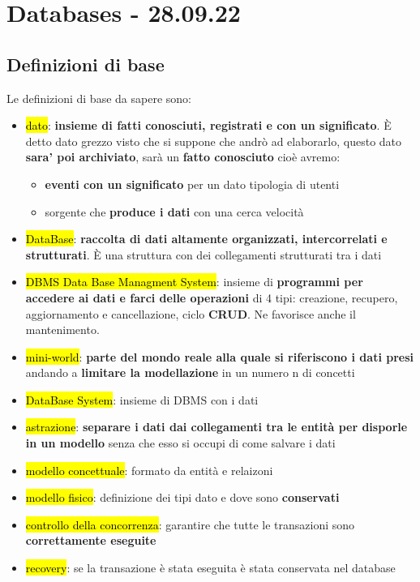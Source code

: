 \newpage
\section{Databases - 28.09.22}

\subsection{Definizioni di base}

Le definizioni di base da sapere sono:
\begin{itemize}
	\item \hl{dato}: \textbf{insieme di fatti conosciuti, registrati e con un significato}. È detto dato grezzo visto che si suppone che andrò ad elaborarlo, questo dato \textbf{sara' poi archiviato}, sarà un \textbf{fatto conosciuto} cioè avremo:
		\begin{itemize}
			\item \textbf{eventi con un significato} per un dato tipologia di utenti 
			\item sorgente che \textbf{produce i dati} con una cerca velocità
		\end{itemize}
	
	\item \hl{DataBase}: \textbf{raccolta di dati altamente organizzati, intercorrelati e strutturati}. È una struttura con dei collegamenti strutturati tra i dati

	\item \hl{DBMS Data Base Managment System}: insieme di \textbf{programmi per accedere ai dati e farci delle operazioni} di 4 tipi: creazione, recupero, aggiornamento e cancellazione, ciclo \textbf{CRUD}. Ne favorisce anche il mantenimento.

	\item \hl{mini-world}: \textbf{parte del mondo reale alla quale si riferiscono i dati presi} andando a \textbf{limitare la modellazione} in un numero n di concetti

	\item \hl{DataBase System}: insieme di DBMS con i dati
	
	\item \hl{astrazione}: \textbf{separare i dati dai collegamenti tra le entità per disporle in un modello} senza che esso si occupi di come salvare i dati
	
	\item \hl{modello concettuale}: formato da entità e relaizoni
	
	\item \hl{modello fisico}: definizione dei tipi dato e dove sono \textbf{conservati}
	
	\item \hl{controllo della concorrenza}: garantire che tutte le transazioni sono \textbf{correttamente eseguite}
	
	\item \hl{recovery}: se la transazione è stata eseguita è stata conservata nel database
\end{itemize}


